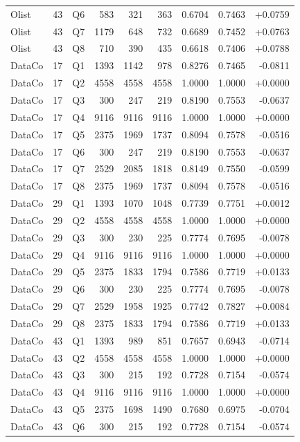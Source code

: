 \documentclass[11pt,letterpaper]{article}
\begin{document}
\begin{longtable}{lrlrrrrrr}
Olist & 43 & Q6 & 583 & 321 & 363 & 0.6704 & 0.7463 & +0.0759\\
Olist & 43 & Q7 & 1179 & 648 & 732 & 0.6689 & 0.7452 & +0.0763\\
Olist & 43 & Q8 & 710 & 390 & 435 & 0.6618 & 0.7406 & +0.0788\\
DataCo & 17 & Q1 & 1393 & 1142 & 978 & 0.8276 & 0.7465 & -0.0811\\
DataCo & 17 & Q2 & 4558 & 4558 & 4558 & 1.0000 & 1.0000 & +0.0000\\
DataCo & 17 & Q3 & 300 & 247 & 219 & 0.8190 & 0.7553 & -0.0637\\
DataCo & 17 & Q4 & 9116 & 9116 & 9116 & 1.0000 & 1.0000 & +0.0000\\
DataCo & 17 & Q5 & 2375 & 1969 & 1737 & 0.8094 & 0.7578 & -0.0516\\
DataCo & 17 & Q6 & 300 & 247 & 219 & 0.8190 & 0.7553 & -0.0637\\
DataCo & 17 & Q7 & 2529 & 2085 & 1818 & 0.8149 & 0.7550 & -0.0599\\
DataCo & 17 & Q8 & 2375 & 1969 & 1737 & 0.8094 & 0.7578 & -0.0516\\
DataCo & 29 & Q1 & 1393 & 1070 & 1048 & 0.7739 & 0.7751 & +0.0012\\
DataCo & 29 & Q2 & 4558 & 4558 & 4558 & 1.0000 & 1.0000 & +0.0000\\
DataCo & 29 & Q3 & 300 & 230 & 225 & 0.7774 & 0.7695 & -0.0078\\
DataCo & 29 & Q4 & 9116 & 9116 & 9116 & 1.0000 & 1.0000 & +0.0000\\
DataCo & 29 & Q5 & 2375 & 1833 & 1794 & 0.7586 & 0.7719 & +0.0133\\
DataCo & 29 & Q6 & 300 & 230 & 225 & 0.7774 & 0.7695 & -0.0078\\
DataCo & 29 & Q7 & 2529 & 1958 & 1925 & 0.7742 & 0.7827 & +0.0084\\
DataCo & 29 & Q8 & 2375 & 1833 & 1794 & 0.7586 & 0.7719 & +0.0133\\
DataCo & 43 & Q1 & 1393 & 989 & 851 & 0.7657 & 0.6943 & -0.0714\\
DataCo & 43 & Q2 & 4558 & 4558 & 4558 & 1.0000 & 1.0000 & +0.0000\\
DataCo & 43 & Q3 & 300 & 215 & 192 & 0.7728 & 0.7154 & -0.0574\\
DataCo & 43 & Q4 & 9116 & 9116 & 9116 & 1.0000 & 1.0000 & +0.0000\\
DataCo & 43 & Q5 & 2375 & 1698 & 1490 & 0.7680 & 0.6975 & -0.0704\\
DataCo & 43 & Q6 & 300 & 215 & 192 & 0.7728 & 0.7154 & -0.0574\\

\end{longtable}
\end{document}
